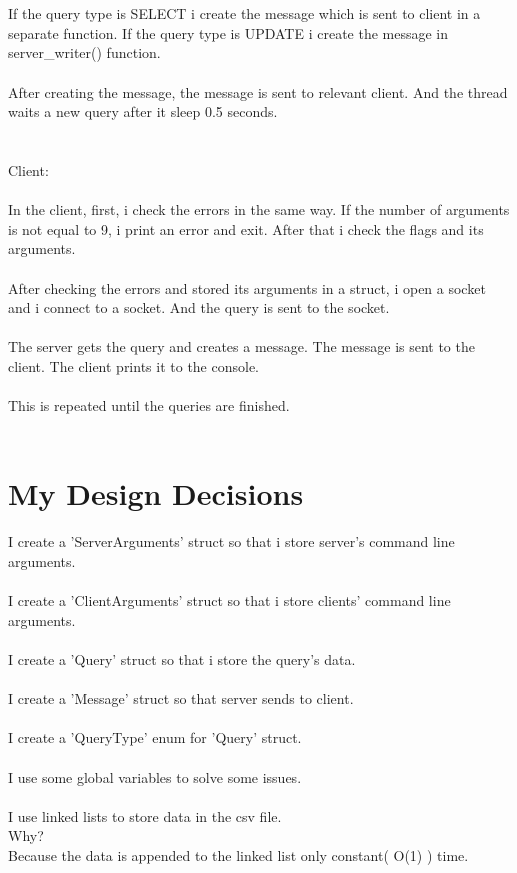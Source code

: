 \documentclass[20pt]{article}
\begin{document}
\\\\
If the query type is SELECT i create the message which is sent to client in a separate function. If the query type is UPDATE i create the message in server\_writer() function.
\\\\
After creating the message, the message is sent to relevant client. And the thread waits a new query after it sleep 0.5 seconds.
\\\\\\
Client: \\\\
In the client, first, i check the errors in the same way. If the number of arguments is not equal to 9, i print an error and exit. After that i check the flags and its arguments.
\\\\
After checking the errors and stored its arguments in a struct, i open a socket and i connect to a socket. And the query is sent to the socket.
\\\\
The server gets the query and creates a message. The message is sent to the client. The client prints it to the console.
\\\\
This is repeated until the queries are finished.\\\\

\section{My Design Decisions}
I create a 'ServerArguments' struct so that i store server's command line arguments.
\\\\
I create a 'ClientArguments' struct so that i store clients' command line arguments.
\\\\
I create a 'Query' struct so that i store the query's data.
\\\\
I create a 'Message' struct so that server sends to client.
\\\\
I create a 'QueryType' enum for 'Query' struct.
\\\\
I use some global variables to solve some issues.
\\\\
I use linked lists to store data in the csv file.\\
Why?\\
Because the data is appended to the linked list only constant( O(1) ) time.
\\\\
\end{document}
